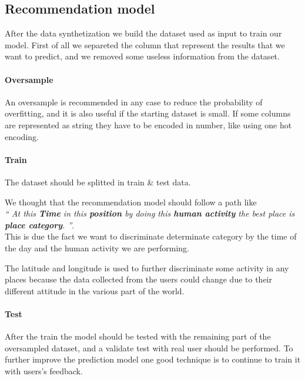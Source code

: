 \documentclass[../../main]{subfiles}
\begin{document}
\label{ss:recommendation-model}
\subsection{Recommendation model}
After the data synthetization we build the dataset used as input to train our model. 
First of all we separeted the column that represent the results that we want to predict, and we removed some useless information from the dataset.
\paragraph*{Oversample}
An oversample is recommended in any case to reduce the probability of overfitting, and it is also useful if the starting dataset is small.
If some columns are represented as string they have to be encoded in number, like using one hot encoding.
\paragraph*{Train}
\label{paragraph:train_design}
The dataset should be splitted in train \& test data.

We thought that the recommendation model should follow a path like \\\textit{`` At this \textbf{Time} in this \textbf{position} by doing this \textbf{human activity} the best place is \textbf{place category}. ''}.
\\This is due the fact we want to discriminate determinate category by the time of the day and the human activity we are performing.

The latitude and longitude is used to further discriminate some activity in any places because the data collected from the users could change due to their different attitude in the various part of the world.
\paragraph*{Test}
After the train the model should be tested with the remaining part of the oversampled dataset, and a validate test with real user should be performed.
To further improve the prediction model one good technique is to continue to train it with users's feedback.
\end{document}
